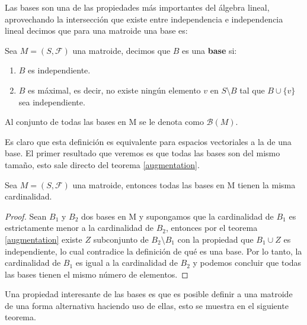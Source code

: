 Las bases son una de las propiedades más importantes del álgebra lineal, aprovechando la intersección que existe entre independencia e independencia lineal decimos que para una matroide una base es: 

\begin{dfn}
Sea $M=(S,\mathcal{F})$ una matroide, decimos que ${B}$ es una \textbf{base} si:
\begin{enumerate}
\item ${B}$ es independiente.
\item ${B}$ es máximal, es decir, no existe ningún elemento $v$ en $S \setminus {B}$ tal que ${B} \cup \{v\}$ sea independiente.
\end{enumerate}
Al conjunto de todas las bases en M se le denota como $\mathcal{B}(M)$.
\end{dfn}

Es claro que esta definición es equivalente para espacios vectoriales a la de una base. El primer resultado que veremos es que todas las bases son del mismo tamaño, esto sale directo del teorema \ref{augmentation}. 

\begin{cor} \label{cor bases}
Sea $M=(S,\mathcal{F})$ una matroide, entonces todas las bases en M tienen la misma cardinalidad.
\end{cor}
\begin{proof}
Sean $B_1$ y $B_2$ dos bases en M y supongamos que la cardinalidad de $B_1$ es estrictamente menor a la cardinalidad de $B_2$, entonces por el teorema \ref{augmentation} existe $Z$ subconjunto de $B_2 \setminus B_1$ con la propiedad que $B_1 \cup Z$ es independiente, lo cual contradice la definición de qué es una base. Por lo tanto, la cardinalidad de $B_1$ es igual a la cardinalidad de $B_2$ y podemos concluir que todas las bases tienen el mismo número de elementos. 
\end{proof}

Una propiedad interesante de las bases es que es posible definir a una matroide de una forma alternativa haciendo uso de ellas, esto se muestra en el siguiente teorema. 

